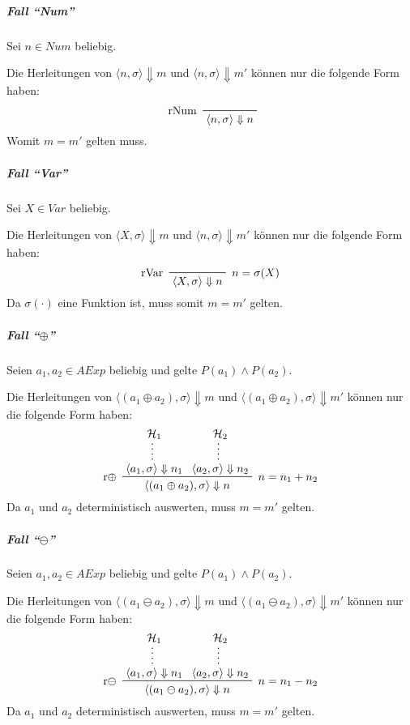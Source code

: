 				\subparagraph{Fall \enquote{Num}}
					Sei $ n \in \textit{Num} $ beliebig.

					Die Herleitungen von $ \langle n, \sigma \rangle \Downarrow m $ und $ \langle n, \sigma \rangle \Downarrow m' $ können nur die folgende Form haben:
					\begin{equation*}
						\prftree[l]
						{ rNum }
						{ \langle n, \sigma \rangle \Downarrow n }
					\end{equation*}
					Womit $ m = m' $ gelten muss.

				\subparagraph{Fall \enquote{Var}}
					Sei $ X \in \textit{Var} $ beliebig.

					Die Herleitungen von $ \langle X, \sigma \rangle \Downarrow m $ und $ \langle n, \sigma \rangle \Downarrow m' $ können nur die folgende Form haben:
					\begin{equation*}
						\prftree[l, r]
						{ $ n = \sigma(X) $ }
						{ rVar }
						{ \langle X, \sigma \rangle \Downarrow n }
					\end{equation*}
					Da $ \sigma(\cdot) $ eine Funktion ist, muss somit $ m = m' $ gelten.

				\subparagraph{Fall \enquote{$ \oplus $}}
					Seien $ a _ 1, a _ 2 \in \textit{AExp} $ beliebig und gelte $ P(a _ 1) \land P(a _ 2) $.

					Die Herleitungen von $ \langle (a _ 1 \oplus a _ 2), \sigma \rangle \Downarrow m $ und $ \langle (a _ 1 \oplus a _ 2), \sigma \rangle \Downarrow m' $ können nur die folgende Form haben:
					\begin{equation*}
						\prftree[l, r]
						{ $ n = n _ 1 + n _ 2 $ }
						{ r$ \oplus $ }
						{ \prfsummary{\mathcal{H} _ 1}{\langle a _ 1, \sigma \rangle \Downarrow n _ 1} }
						{ \prfsummary{\mathcal{H} _ 2}{\langle a _ 2, \sigma \rangle \Downarrow n _ 2} }
						{ \langle (a _ 1 \oplus a _ 2), \sigma \rangle \Downarrow n }
					\end{equation*}
					Da $ a _ 1 $ und $ a _ 2 $ deterministisch auswerten, muss $ m = m' $ gelten.

				\subparagraph{Fall \enquote{$ \ominus $}}
					Seien $ a _ 1, a _ 2 \in \textit{AExp} $ beliebig und gelte $ P(a _ 1) \land P(a _ 2) $.

					Die Herleitungen von $ \langle (a _ 1 \ominus a _ 2), \sigma \rangle \Downarrow m $ und $ \langle (a _ 1 \ominus a _ 2), \sigma \rangle \Downarrow m' $ können nur die folgende Form haben:
					\begin{equation*}
						\prftree[l, r]
						{ $ n = n _ 1 - n _ 2 $ }
						{ r$ \ominus $ }
						{ \prfsummary{\mathcal{H} _ 1}{\langle a _ 1, \sigma \rangle \Downarrow n _ 1} }
						{ \prfsummary{\mathcal{H} _ 2}{\langle a _ 2, \sigma \rangle \Downarrow n _ 2} }
						{ \langle (a _ 1 \ominus a _ 2), \sigma \rangle \Downarrow n }
					\end{equation*}
					Da $ a _ 1 $ und $ a _ 2 $ deterministisch auswerten, muss $ m = m' $ gelten.

